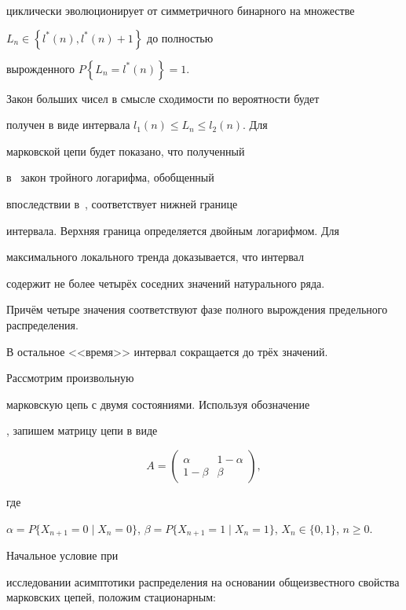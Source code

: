 циклически эволюционирует от симметричного бинарного на множестве

$L_n \in \left\{ l^\ast ( n ),l^\ast ( n )+1\right\}$ до полностью

вырожденного $P \left\{ L_n =l^\ast ( n )\right\}=1$.



Закон больших чисел в смысле сходимости по вероятности будет

получен в виде интервала $l_1 ( n )\le L_n \le l_2 ( n )$. Для

марковской цепи будет показано, что полученный

в~\cite{barvinok:bib1}  закон тройного логарифма, обобщенный

впоследствии в~\cite{barvinok:bib3}, соответствует нижней границе

интервала. Верхняя граница определяется двойным логарифмом. Для

максимального локального тренда доказывается, что интервал

содержит не более четырёх соседних значений натурального ряда.

Причём четыре значения соответствуют фазе полного вырождения предельного распределения. 

В остальное <<время>> интервал сокращается до трёх значений.



\smallskip



 Рассмотрим произвольную

марковскую цепь с двумя состояниями. Используя обозначение

\cite{barvinok:bib1,barvinok:bib3}, запишем матрицу цепи в виде

$$A=\begin{pmatrix}

 \alpha & 1-\alpha \\

 1-\beta & \beta

 \end{pmatrix},$$

где 

$\alpha =P \{X_{n+1} =0\mid X_n =0\}$, $\beta =P \{X_{n+1} =1 \mid X_n =1\}$, $X_n \in \{0, 1\}$, $ n\ge 0.$ 

Начальное условие при

исследовании асимптотики распределения на основании общеизвестного свойства марковских цепей, положим стационарным:

